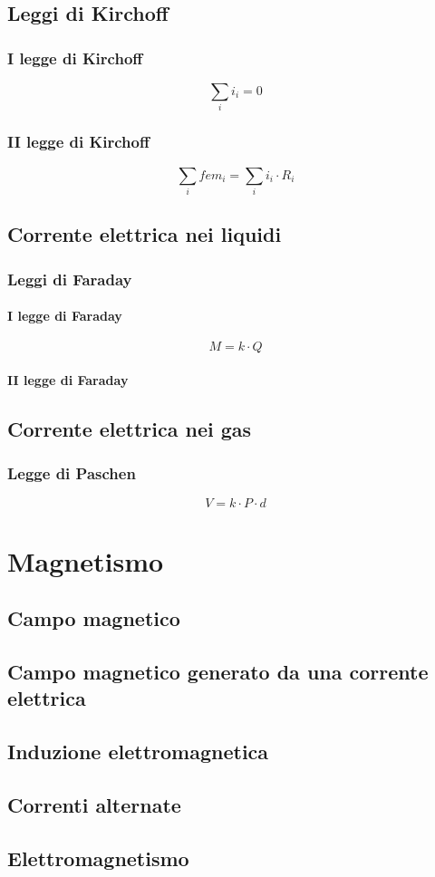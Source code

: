 \documentclass[a4paper,12pt]{article}
\theoremstyle{mystyle}
\begin{document}
\subsection{Leggi di Kirchoff}
\subsubsection{I legge di Kirchoff}
\[\sum_i i_i = 0\]
\subsubsection{II legge di Kirchoff}
\[\sum_i fem _i = \sum_i i_i \cdot R_i\]

\newpage


\subsection{Corrente elettrica nei liquidi}
\subsubsection{Leggi di Faraday}
\paragraph{I legge di Faraday}
\[M = k \cdot Q\]
\paragraph{II legge di Faraday}

\newpage


\subsection{Corrente elettrica nei gas}
\subsubsection{Legge di Paschen}
\[V = k \cdot P \cdot d\]


\newpage


\section{Magnetismo}
\subsection{Campo magnetico}
\newpage

\subsection{Campo magnetico generato da una corrente elettrica}
\newpage

\subsection{Induzione elettromagnetica}
\newpage

\subsection{Correnti alternate}
\newpage

\subsection{Elettromagnetismo}
\end{document}
